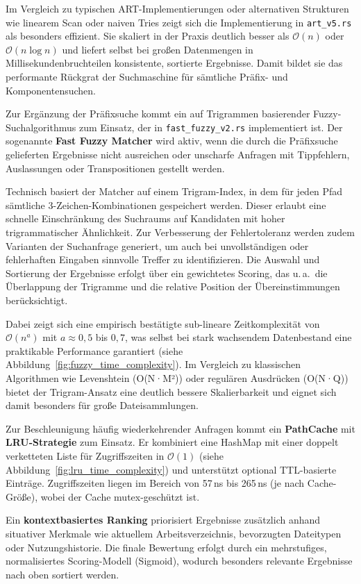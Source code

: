 Im Vergleich zu typischen ART-Implementierungen oder alternativen Strukturen wie linearem Scan oder naiven Tries
zeigt sich die Implementierung in \verb|art_v5.rs| als besonders effizient.
Sie skaliert in der Praxis deutlich besser als $\mathcal{O}(n)$ oder $\mathcal{O}(n \log n)$
und liefert selbst bei großen Datenmengen in Millisekundenbruchteilen konsistente, sortierte Ergebnisse.
Damit bildet sie das performante Rückgrat der Suchmaschine für sämtliche Präfix- und Komponentensuchen.

Zur Ergänzung der Präfixsuche kommt ein auf Trigrammen basierender Fuzzy-Suchalgorithmus zum Einsatz,
der in \verb|fast_fuzzy_v2.rs| implementiert ist.
Der sogenannte \textbf{Fast Fuzzy Matcher} wird aktiv, wenn die durch die Präfixsuche gelieferten Ergebnisse nicht ausreichen
oder unscharfe Anfragen mit Tippfehlern, Auslassungen oder Transpositionen gestellt werden.

Technisch basiert der Matcher auf einem Trigram-Index, in dem für jeden Pfad sämtliche 3-Zeichen-Kombinationen gespeichert werden.
Dieser erlaubt eine schnelle Einschränkung des Suchraums auf Kandidaten mit hoher trigrammatischer Ähnlichkeit.
Zur Verbesserung der Fehlertoleranz werden zudem Varianten der Suchanfrage generiert, um auch bei unvollständigen oder fehlerhaften Eingaben sinnvolle Treffer zu identifizieren.
Die Auswahl und Sortierung der Ergebnisse erfolgt über ein gewichtetes Scoring, das u.\,a.\ die Überlappung der Trigramme und die relative Position der Übereinstimmungen berücksichtigt.

Dabei zeigt sich eine empirisch bestätigte sub-lineare Zeitkomplexität von $\mathcal{O}(n^a)$ mit $a \approx 0{,}5$ bis $0{,}7$,
was selbst bei stark wachsendem Datenbestand eine praktikable Performance garantiert (siehe Abbildung~\ref{fig:fuzzy_time_complexity}).
Im Vergleich zu klassischen Algorithmen wie Levenshtein (O(N·M²)) oder regulären Ausdrücken (O(N·Q)) bietet der Trigram-Ansatz eine deutlich bessere Skalierbarkeit
und eignet sich damit besonders für große Dateisammlungen.

Zur Beschleunigung häufig wiederkehrender Anfragen kommt ein \textbf{PathCache} mit \textbf{LRU-Strategie} zum Einsatz.
Er kombiniert eine HashMap mit einer doppelt verketteten Liste für Zugriffszeiten in $\mathcal{O}(1)$ (siehe Abbildung~\ref{fig:lru_time_complexity}) und unterstützt optional TTL-basierte Einträge.
Zugriffszeiten liegen im Bereich von 57\,ns bis 265\,ns (je nach Cache-Größe), wobei der Cache mutex-geschützt ist. 

Ein \textbf{kontextbasiertes Ranking} priorisiert Ergebnisse zusätzlich anhand situativer Merkmale wie aktuellem Arbeitsverzeichnis, bevorzugten Dateitypen oder Nutzungshistorie.
Die finale Bewertung erfolgt durch ein mehrstufiges, normalisiertes Scoring-Modell (Sigmoid), wodurch besonders relevante Ergebnisse nach oben sortiert werden.

